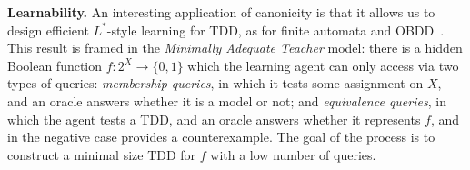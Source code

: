 
\nocite{bojanczyk} %

{\bf Learnability. } An interesting application of canonicity is that  it allows us to design efficient $L^*$-style learning for TDD, as for finite automata and OBDD~\cite{angluin1987learning}. This result is framed in the {\em Minimally Adequate Teacher} model: there is a hidden Boolean function $f:2^X\to\{0,1\}$ which the learning agent can only access via two types of queries: {\em membership queries}, in which it tests some assignment on $X$, and an oracle answers whether it is a model or not; and {\em equivalence queries}, in which the agent tests a TDD, and an oracle answers whether it represents $f$, and in the negative case provides a counterexample. The goal of the process is to construct a minimal size TDD for $f$ with a low number of queries.

